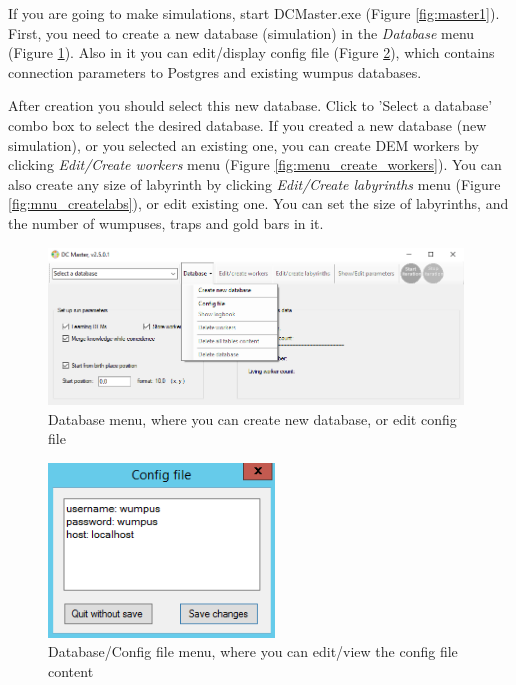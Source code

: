 \documentclass[a4paper,12pt]{article}
\begin{document}
If you are going to make simulations, start DCMaster.exe (Figure \ref{fig:master1}). First, you need to create a new database (simulation) in the \textit{Database} menu (Figure \ref{fig:menu_database}). Also in it you can edit/display config file (Figure \ref{fig:config}), which contains connection parameters to Postgres and existing wumpus databases. 

After creation you should select this new database. Click to 'Select a database' combo box to select the desired database.
If you created a new database (new simulation), or you selected an existing one,  you can create DEM workers by clicking \textit{Edit/Create workers} menu (Figure \ref{fig:menu_create_workers}). 
You can also create any size of labyrinth by clicking \textit{Edit/Create labyrinths} menu (Figure \ref{fig:mnu_createlabs}), or edit existing one. You can set the size of  labyrinths, and the number of wumpuses, traps and gold bars in it. 






\begin{figure}
	\begin{center}
		\includegraphics[width=11cm]{menu_database.png}
		\caption{Database menu, where you can create new database, or edit config file}
		\label{fig:menu_database}
	\end{center}
\end{figure}

\begin{figure}
	\begin{center}
		\includegraphics[width=6cm]{config.png}
		\caption{Database/Config file menu, where you can edit/view the config file content}
		\label{fig:config}
	\end{center}
\end{figure}
\end{document}
